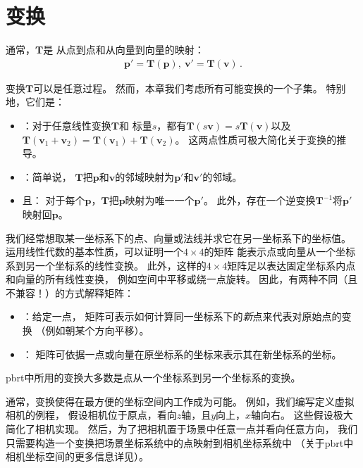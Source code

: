 \section{变换}\label{sec:变换}

通常，$\bm T$是
从点到点和从向量到向量的映射：
\begin{align*}
    \bm p'=\bm T(\bm p), \  \bm v'=\bm T(\bm v)\, .
\end{align*}

变换$\bm T$可以是任意过程。
然而，本章我们考虑所有可能变换的一个子集。
特别地，它们是：
\begin{itemize}
    \item {}：对于任意线性变换$\bm T$和
          标量$s$，都有$\bm T(s\bm v)=s\bm T(\bm v)$以及
          $\bm T(\bm v_1+\bm v_2)=\bm T(\bm v_1)+\bm T(\bm v_2)$。
          这两点性质可极大简化关于变换的推导。
    \item {}：简单说，
          $\bm T$把$\bm p$和$\bm v$的邻域映射为$\bm p'$和$\bm v'$的邻域。
    \item {}且：
          对于每个$\bm p$，$\bm T$把$\bm p$映射为唯一一个$\bm p'$。
          此外，存在一个逆变换$\bm T^{-1}$将$\bm p'$映射回$\bm p$。
\end{itemize}

我们经常想取某一坐标系下的点、向量或法线并求它在另一坐标系下的坐标值。
运用线性代数的基本性质，可以证明一个$4\times4$的矩阵
能表示点或向量从一个坐标系到另一个坐标系的线性变换。
此外，这样的$4\times4$矩阵足以表达固定坐标系内点和向量的所有线性变换，
例如空间中平移或绕一点旋转。
因此，有两种不同（且不兼容！）的方式解释矩阵：
\begin{itemize}
    \item {}：给定一点，
          矩阵可表示如何计算同一坐标系下的\emph{新}点来代表对原始点的变换
          （例如朝某个方向平移）。
    \item {}：
          矩阵可依据一点或向量在原坐标系的坐标来表示其在新坐标系的坐标。
\end{itemize}

pbrt中所用的变换大多数是点从一个坐标系到另一个坐标系的变换。

通常，变换使得在最方便的坐标空间内工作成为可能。
例如，我们编写定义虚拟相机的例程，
假设相机位于原点，看向$z$轴，且$y$向上，$x$轴向右。
这些假设极大简化了相机实现。
然后，为了把相机置于场景中任意一点并看向任意方向，
我们只需要构造一个变换把场景坐标系统中的点映射到相机坐标系统中
（关于pbrt中相机坐标空间的更多信息详见）。

